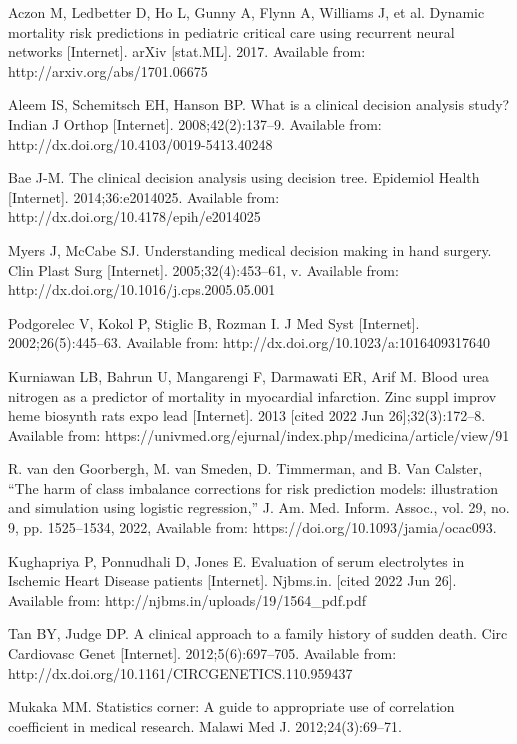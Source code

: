 \begin{thebibliography}{00}
Aczon M, Ledbetter D, Ho L, Gunny A, Flynn A, Williams J, et al. Dynamic mortality risk predictions in pediatric critical care using recurrent neural networks [Internet]. arXiv [stat.ML]. 2017. Available from: http://arxiv.org/abs/1701.06675
 	 
Aleem IS, Schemitsch EH, Hanson BP. What is a clinical decision analysis study? Indian J Orthop [Internet]. 2008;42(2):137–9. Available from: http://dx.doi.org/10.4103/0019-5413.40248
 	 
Bae J-M. The clinical decision analysis using decision tree. Epidemiol Health [Internet]. 2014;36:e2014025. Available from: http://dx.doi.org/10.4178/epih/e2014025
 	 
Myers J, McCabe SJ. Understanding medical decision making in hand surgery. Clin Plast Surg [Internet]. 2005;32(4):453–61, v. Available from: http://dx.doi.org/10.1016/j.cps.2005.05.001
 	 
Podgorelec V, Kokol P, Stiglic B, Rozman I. J Med Syst [Internet]. 2002;26(5):445–63. Available from: http://dx.doi.org/10.1023/a:1016409317640
 	 
Kurniawan LB, Bahrun U, Mangarengi F, Darmawati ER, Arif M. Blood urea nitrogen as a predictor of mortality in myocardial infarction. Zinc suppl improv heme biosynth rats expo lead [Internet]. 2013 [cited 2022 Jun 26];32(3):172–8. Available from: https://univmed.org/ejurnal/index.php/medicina/article/view/91

R. van den Goorbergh, M. van Smeden, D. Timmerman, and B. Van Calster, “The harm of class imbalance corrections for risk prediction models: illustration and simulation using logistic regression,” J. Am. Med. Inform. Assoc., vol. 29, no. 9, pp. 1525–1534, 2022, Available from: https://doi.org/10.1093/jamia/ocac093.

Kughapriya P, Ponnudhali D, Jones E. Evaluation of serum electrolytes in Ischemic Heart Disease patients [Internet]. Njbms.in. [cited 2022 Jun 26]. Available from: http://njbms.in/uploads/19/1564\_pdf.pdf
 	 
Tan BY, Judge DP. A clinical approach to a family history of sudden death. Circ Cardiovasc Genet [Internet]. 2012;5(6):697–705. Available from: http://dx.doi.org/10.1161/CIRCGENETICS.110.959437
 	 
Mukaka MM. Statistics corner: A guide to appropriate use of correlation coefficient in medical research. Malawi Med J. 2012;24(3):69–71.
 	 

\end{thebibliography}
